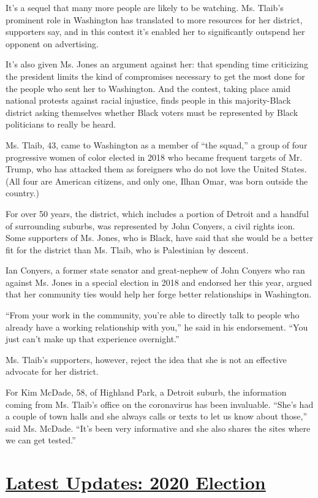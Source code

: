 It's a sequel that many more people are likely to be watching. Ms.
Tlaib's prominent role in Washington has translated to more resources
for her district, supporters say, and in this contest it's enabled her
to significantly outspend her opponent on advertising.

It's also given Ms. Jones an argument against her: that spending time
criticizing the president limits the kind of compromises necessary to
get the most done for the people who sent her to Washington. And the
contest, taking place amid national protests against racial injustice,
finds people in this majority-Black district asking themselves whether
Black voters must be represented by Black politicians to really be
heard.

Ms. Tlaib, 43, came to Washington as a member of ``the squad,'' a group
of four progressive women of color elected in 2018 who became frequent
targets of Mr. Trump, who has attacked them as foreigners who do not
love the United States. (All four are American citizens, and only one,
Ilhan Omar, was born outside the country.)

For over 50 years, the district, which includes a portion of Detroit and
a handful of surrounding suburbs, was represented by John Conyers, a
civil rights icon. Some supporters of Ms. Jones, who is Black, have said
that she would be a better fit for the district than Ms. Tlaib, who is
Palestinian by descent.

Ian Conyers, a former state senator and great-nephew of John Conyers who
ran against Ms. Jones in a special election in 2018 and endorsed her
this year, argued that her community ties would help her forge better
relationships in Washington.

``From your work in the community, you're able to directly talk to
people who already have a working relationship with you,'' he said in
his endorsement. ``You just can't make up that experience overnight.''

Ms. Tlaib's supporters, however, reject the idea that she is not an
effective advocate for her district.

For Kim McDade, 58, of Highland Park, a Detroit suburb, the information
coming from Ms. Tlaib's office on the coronavirus has been invaluable.
``She's had a couple of town halls and she always calls or texts to let
us know about those,'' said Ms. McDade. ``It's been very informative and
she also shares the sites where we can get tested.''

\hypertarget{latest-updates-2020-election}{%
\section{\texorpdfstring{\href{https://www.nytimes3xbfgragh.onion/2020/08/04/us/elections/primary-election-michigan-arizona-kansas.html?action=click\&pgtype=Article\&state=default\&region=MAIN_CONTENT_1\&context=storylines_live_updates}{Latest
Updates: 2020
Election}}{Latest Updates: 2020 Election}}\label{latest-updates-2020-election}}

